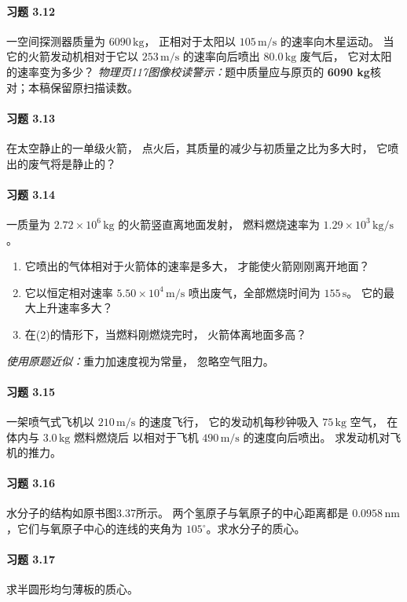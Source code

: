 \paragraph{习题 3.12}
一空间探测器质量为 \(6090\,\mathrm{kg}\)，
正相对于太阳以 \(105\,\mathrm{m/s}\) 的速率向木星运动。
当它的火箭发动机相对于它以
\(253\,\mathrm{m/s}\) 的速率向后喷出
\(80.0\,\mathrm{kg}\) 废气后，
它对太阳的速率变为多少？
\textit{物理页117图像校读警示：}题中质量应与原页的
\textbf{6090 kg}核对；本稿保留原扫描读数。

\paragraph{习题 3.13}
在太空静止的一单级火箭，
点火后，其质量的减少与初质量之比为多大时，
它喷出的废气将是静止的？

\paragraph{习题 3.14}
一质量为 \(2.72\times10^6\,\mathrm{kg}\) 的火箭竖直离地面发射，
燃料燃烧速率为 \(1.29\times10^3\,\mathrm{kg/s}\)。
\begin{enumerate}
\item 它喷出的气体相对于火箭体的速率是多大，
才能使火箭刚刚离开地面？
\item 它以恒定相对速率 \(5.50\times10^4\,\mathrm{m/s}\)
 喷出废气，全部燃烧时间为 \(155\,\mathrm s\)。
 它的最大上升速率多大？
\item 在(2)的情形下，当燃料刚燃烧完时，
火箭体离地面多高？
\end{enumerate}
\textit{使用原题近似：}重力加速度视为常量，
忽略空气阻力。

\paragraph{习题 3.15}
一架喷气式飞机以 \(210\,\mathrm{m/s}\) 的速度飞行，
它的发动机每秒钟吸入 \(75\,\mathrm{kg}\) 空气，
在体内与 \(3.0\,\mathrm{kg}\) 燃料燃烧后
以相对于飞机 \(490\,\mathrm{m/s}\) 的速度向后喷出。
求发动机对飞机的推力。

\paragraph{习题 3.16}
水分子的结构如原书图3.37所示。
两个氢原子与氧原子的中心距离都是
\(0.0958\,\mathrm{nm}\)，它们与氧原子中心的连线的夹角为
\(105^\circ\)。求水分子的质心。

\paragraph{习题 3.17}
求半圆形均匀薄板的质心。

